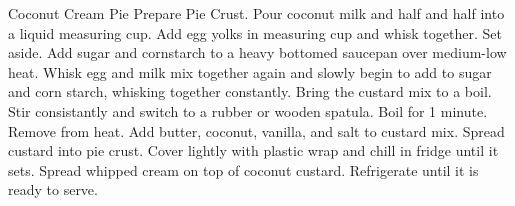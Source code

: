 \documentclass[../cookbook.tex]{subfiles}
\begin{document}
\begin{recipe}{Coconut Cream Pie}{}{}
    Prepare Pie Crust.
    Pour coconut milk and half and half into a liquid measuring cup.
    Add egg yolks in measuring cup and whisk together. Set aside.
    Add sugar and cornstarch to a heavy bottomed saucepan over medium-low heat.
    Whisk egg and milk mix together again and slowly begin to add to sugar and
    corn starch, whisking together constantly. Bring the custard mix to a boil.
    Stir consistantly and switch to a rubber or wooden spatula. Boil for 1
    minute. Remove from heat.
    Add butter, coconut, vanilla, and salt to custard mix. Spread custard into
    pie crust. Cover lightly with plastic wrap and chill in fridge until it
    sets.
    Spread whipped cream on top of coconut custard. Refrigerate until it is
    ready to serve.
\end{recipe}
\end{document}

